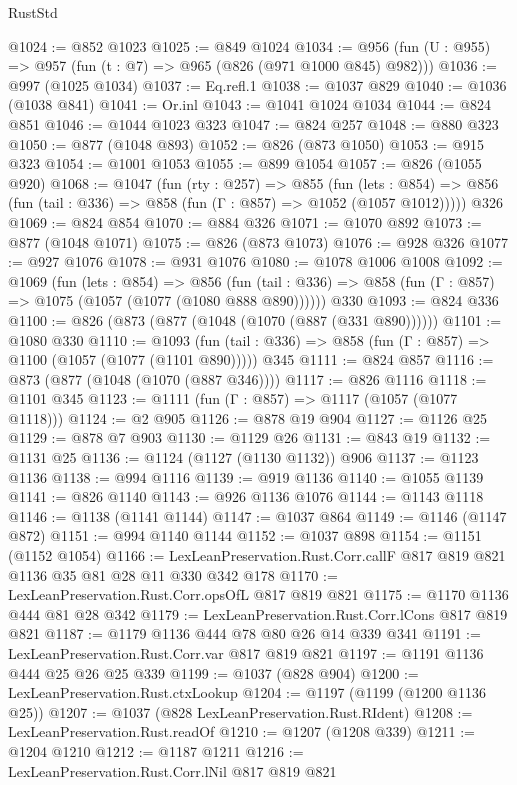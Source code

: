 \begin{lexlean}{RustStd}
\begin{coremodule}
@1024 := @852 @1023
@1025 := @849 @1024
@1034 := @956 (fun (U : @955) => @957 (fun (t : @7) => @965 (@826 (@971 @1000 @845) @982)))
@1036 := @997 (@1025 @1034)
@1037 := Eq.refl.{1}
@1038 := @1037 @829
@1040 := @1036 (@1038 @841)
@1041 := Or.inl
@1043 := @1041 @1024 @1034
@1044 := @824 @851
@1046 := @1044 @1023 @323
@1047 := @824 @257
@1048 := @880 @323
@1050 := @877 (@1048 @893)
@1052 := @826 (@873 @1050)
@1053 := @915 @323
@1054 := @1001 @1053
@1055 := @899 @1054
@1057 := @826 (@1055 @920)
@1068 := @1047
    (fun (rty : @257) =>
    @855
      (fun (lets : @854) =>
      @856 (fun (tail : @336) => @858 (fun (Γ : @857) => @1052 (@1057 @1012)))))
    @326
@1069 := @824 @854
@1070 := @884 @326
@1071 := @1070 @892
@1073 := @877 (@1048 @1071)
@1075 := @826 (@873 @1073)
@1076 := @928 @326
@1077 := @927 @1076
@1078 := @931 @1076
@1080 := @1078 @1006 @1008
@1092 := @1069
    (fun (lets : @854) =>
    @856 (fun (tail : @336) => @858 (fun (Γ : @857) => @1075 (@1057 (@1077 (@1080 @888 @890))))))
    @330
@1093 := @824 @336
@1100 := @826 (@873 (@877 (@1048 (@1070 (@887 (@331 @890))))))
@1101 := @1080 @330
@1110 := @1093
    (fun (tail : @336) => @858 (fun (Γ : @857) => @1100 (@1057 (@1077 (@1101 @890)))))
    @345
@1111 := @824 @857
@1116 := @873 (@877 (@1048 (@1070 (@887 @346))))
@1117 := @826 @1116
@1118 := @1101 @345
@1123 := @1111 (fun (Γ : @857) => @1117 (@1057 (@1077 @1118)))
@1124 := @2 @905
@1126 := @878 @19 @904
@1127 := @1126 @25
@1129 := @878 @7 @903
@1130 := @1129 @26
@1131 := @843 @19
@1132 := @1131 @25
@1136 := @1124 (@1127 (@1130 @1132)) @906
@1137 := @1123 @1136
@1138 := @994 @1116
@1139 := @919 @1136
@1140 := @1055 @1139
@1141 := @826 @1140
@1143 := @926 @1136 @1076
@1144 := @1143 @1118
@1146 := @1138 (@1141 @1144)
@1147 := @1037 @864
@1149 := @1146 (@1147 @872)
@1151 := @994 @1140 @1144
@1152 := @1037 @898
@1154 := @1151 (@1152 @1054)
@1166 := LexLeanPreservation.Rust.Corr.callF @817 @819 @821 @1136 @35 @81 @28 @11 @330 @342 @178
@1170 := LexLeanPreservation.Rust.Corr.opsOfL @817 @819 @821
@1175 := @1170 @1136 @444 @81 @28 @342
@1179 := LexLeanPreservation.Rust.Corr.lCons @817 @819 @821
@1187 := @1179 @1136 @444 @78 @80 @26 @14 @339 @341
@1191 := LexLeanPreservation.Rust.Corr.var @817 @819 @821
@1197 := @1191 @1136 @444 @25 @26 @25 @339
@1199 := @1037 (@828 @904)
@1200 := LexLeanPreservation.Rust.ctxLookup
@1204 := @1197 (@1199 (@1200 @1136 @25))
@1207 := @1037 (@828 LexLeanPreservation.Rust.RIdent)
@1208 := LexLeanPreservation.Rust.readOf
@1210 := @1207 (@1208 @339)
@1211 := @1204 @1210
@1212 := @1187 @1211
@1216 := LexLeanPreservation.Rust.Corr.lNil @817 @819 @821

\end{coremodule}
\end{lexlean}
